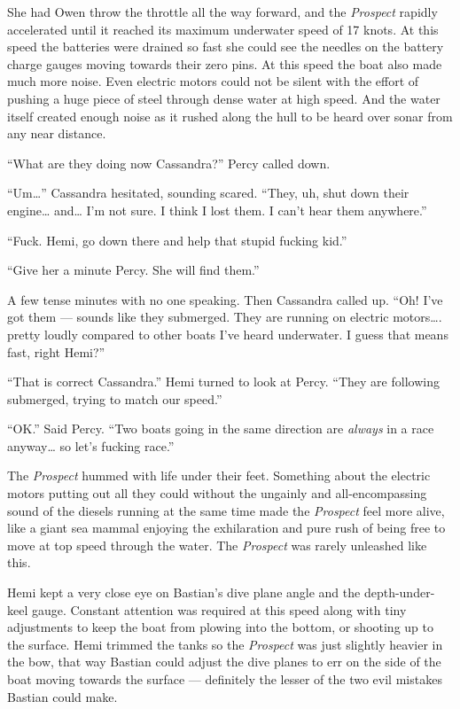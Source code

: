 \documentclass[
]{scrbook}
\begin{document}
She had Owen throw the throttle all the way forward, and the
\emph{Prospect} rapidly accelerated until it reached its maximum
underwater speed of 17 knots. At this speed the batteries were drained
so fast she could see the needles on the battery charge gauges moving
towards their zero pins. At this speed the boat also made much more
noise. Even electric motors could not be silent with the effort of
pushing a huge piece of steel through dense water at high speed. And the
water itself created enough noise as it rushed along the hull to be
heard over sonar from any near distance.

``What are they doing now Cassandra?'' Percy called down.

``Um\ldots{}'' Cassandra hesitated, sounding scared. ``They, uh, shut
down their engine\ldots{} and\ldots{} I'm not sure. I think I lost them.
I can't hear them anywhere.''

``Fuck. Hemi, go down there and help that stupid fucking kid.''

``Give her a minute Percy. She will find them.''

A few tense minutes with no one speaking. Then Cassandra called up.
``Oh! I've got them --- sounds like they submerged. They are running on
electric motors\ldots. pretty loudly compared to other boats I've heard
underwater. I guess that means fast, right Hemi?''

``That is correct Cassandra.'' Hemi turned to look at Percy. ``They are
following submerged, trying to match our speed.''

``OK.'' Said Percy. ``Two boats going in the same direction are
\emph{always} in a race anyway\ldots{} so let's fucking race.''

The \emph{Prospect} hummed with life under their feet. Something about
the electric motors putting out all they could without the ungainly and
all-encompassing sound of the diesels running at the same time made the
\emph{Prospect} feel more alive, like a giant sea mammal enjoying the
exhilaration and pure rush of being free to move at top speed through
the water. The \emph{Prospect} was rarely unleashed like this.

Hemi kept a very close eye on Bastian's dive plane angle and the
depth-under-keel gauge. Constant attention was required at this speed
along with tiny adjustments to keep the boat from plowing into the
bottom, or shooting up to the surface. Hemi trimmed the tanks so the
\emph{Prospect} was just slightly heavier in the bow, that way Bastian
could adjust the dive planes to err on the side of the boat moving
towards the surface --- definitely the lesser of the two evil mistakes
Bastian could make.
\end{document}
